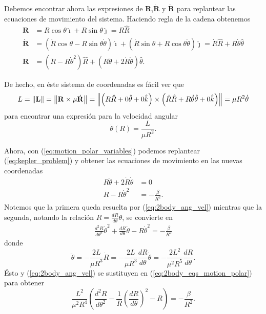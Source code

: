 Debemos encontrar ahora las expresiones de $\mathbf{R}$,$\dot{\mathbf{R}}$ y $\ddot{\mathbf{R}}$ para replantear las ecuaciones de movimiento del sistema. Haciendo regla de la cadena obtenemos
\begin{align}
 \mathbf{R} &= R \cos \theta \hat{\imath} + R \sin \theta \hat{\jmath} = R \hat{R} \\
 \dot{\mathbf{R}} &= \left( \dot{R} \cos \theta - R \sin \theta \dot{\theta} \right) \hat{\imath} + \left( \dot{R} \sin \theta + R \cos \theta \dot{\theta} \right) \hat{\jmath} = \dot{R}\hat{R} + R \dot{\theta} \hat{\theta} \\
 \ddot{\mathbf{R}} &= \left(\ddot{R} - R \dot{\theta}^2 \right) \hat{R} + \left( R \ddot{\theta} + 2 \dot{R}\dot{\theta} \right) \hat{\theta}.
 \label{eq:motion_polar_variables}
\end{align}

De hecho, en éste sistema de coordenadas es fácil ver que
\begin{equation}
 L = \left\lVert \mathbf{L} \right\rVert = \left\lVert \mathbf{R} \times \mu \dot{\mathbf{R}} \right\rVert = \left\lVert \left( R \hat{R} + 0 \hat{\theta} + 0 \hat{k} \right) \times \left( \dot{R} \hat{R} + R \dot{\theta} \hat{\theta} + 0\hat{k} \right) \right\rVert = \mu R^2 \dot{\theta}
\end{equation}
para encontrar una expresión para la velocidad angular 
\begin{equation}
\dot{\theta}(R) = \frac{L}{\mu R^2}.
\label{eq:2body_ang_vel}
\end{equation}

Ahora, con (\ref{eq:motion_polar_variables}) podemos replantear (\ref{eq:kepler_problem}) y obtener las ecuaciones de movimiento en las nuevas coordenadas
\begin{align}
 R \ddot{\theta} + 2 \dot{R} \dot{\theta} &= 0 \\
 \ddot{R} - R \dot{\theta}^2 &= -\frac{\beta}{R^2}.
 \label{eq:2body_eqs_motion_polar}
\end{align}
Notemos que la primera queda resuelta por (\ref{eq:2body_ang_vel}) mientras que la segunda, notando la relación $\dot{R} = \frac{d R}{d\theta} \dot{\theta}$, se convierte en
\begin{align*}
 \frac{d^2 R}{d \theta^2} \dot{\theta}^2 + \frac{dR}{d\theta} \ddot{\theta} - R \dot{\theta}^2 = - \frac{\beta}{R^2}
\end{align*}
donde 
\begin{equation*}
 \ddot{\theta} = -\frac{2L}{\mu R^3}\dot{R} = -\frac{2L}{\mu R^3} \frac{dR}{d\theta}\dot{\theta} = - \frac{2L^2}{\mu^2 R^5} \frac{dR}{d\theta}.
\end{equation*}
Ésto y (\ref{eq:2body_ang_vel}) se sustituyen en  (\ref{eq:2body_eqs_motion_polar}) para obtener
\begin{equation*}
 \frac{L^2}{\mu^2 R^4}\left( \frac{d^2R}{d\theta^2} - \frac{1}{R} \left(\frac{dR}{d\theta} \right)^2 -R \right) = - \frac{\beta}{R^2}.
\end{equation*}

